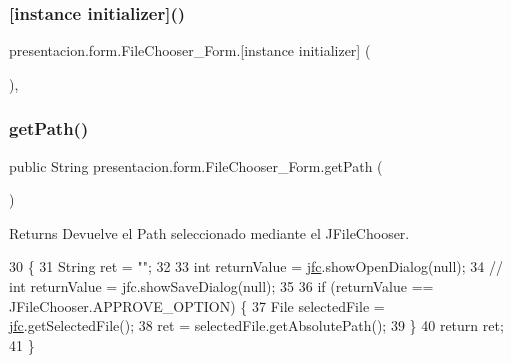 \subsubsection{\texorpdfstring{[instance initializer]()}{[instance initializer]()}}
{\footnotesize\ttfamily presentacion.\+form.\+File\+Chooser\+\_\+\+Form.\mbox{[}instance initializer\mbox{]} (\begin{DoxyParamCaption}{ }\end{DoxyParamCaption})\hspace{0.3cm}{\ttfamily [inline]}, {\ttfamily [package]}}

\mbox{\label{classpresentacion_1_1form_1_1FileChooser__Form_a599510439b2d28102d3b34f589919500}} 
\subsubsection{\texorpdfstring{get\+Path()}{getPath()}}
{\footnotesize\ttfamily public String presentacion.\+form.\+File\+Chooser\+\_\+\+Form.\+get\+Path (\begin{DoxyParamCaption}{ }\end{DoxyParamCaption})\hspace{0.3cm}{\ttfamily [inline]}}

\begin{DoxyReturn}{Returns}
Devuelve el Path seleccionado mediante el J\+File\+Chooser. 
\end{DoxyReturn}

\begin{DoxyCode}
30                             \{
31         String ret = \textcolor{stringliteral}{""};
32 
33         \textcolor{keywordtype}{int} returnValue = \hyperlink{classpresentacion_1_1form_1_1FileChooser__Form_a6fc55a912c266f0379aab09209dd858c}{jfc}.showOpenDialog(null);
34         \textcolor{comment}{// int returnValue = jfc.showSaveDialog(null);}
35 
36         \textcolor{keywordflow}{if} (returnValue == JFileChooser.APPROVE\_OPTION) \{
37             File selectedFile = \hyperlink{classpresentacion_1_1form_1_1FileChooser__Form_a6fc55a912c266f0379aab09209dd858c}{jfc}.getSelectedFile();
38             ret = selectedFile.getAbsolutePath();
39         \}
40         \textcolor{keywordflow}{return} ret;
41     \}
\end{DoxyCode}


